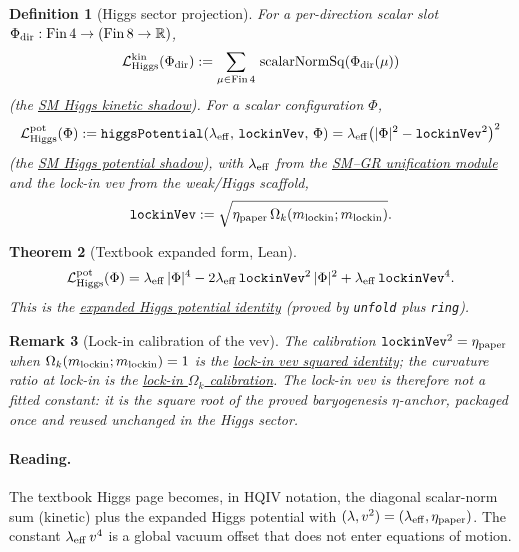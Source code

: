 \documentclass[11pt]{amsart}
\newtheorem{theorem}{Theorem}[section]
\newtheorem{definition}[theorem]{Definition}
\newtheorem{remark}[theorem]{Remark}
\begin{document}
\begin{definition}[Higgs sector projection]
\label{def:higgs}
For a per-direction scalar slot $\Phi_{\rm dir}:\mathrm{Fin}\,4\to(\mathrm{Fin}\,8\to\mathbb{R})$,
\[
\mathcal{L}_{\rm Higgs}^{\rm kin}(\Phi_{\rm dir})
:= \sum_{\mu\in\mathrm{Fin}\,4}\,\mathrm{scalarNormSq}(\Phi_{\rm dir}(\mu))
\]
(the \hyperref[lean:LSM-Higgs-kin]{SM Higgs kinetic shadow}). For a scalar
configuration $\Phi$,
\[
\mathcal{L}_{\rm Higgs}^{\rm pot}(\Phi)
:= \texttt{higgsPotential}(\lambda_{\rm eff},\,\texttt{lockinVev},\,\Phi)
= \lambda_{\rm eff}\bigl(|\Phi|^2 - \texttt{lockinVev}^2\bigr)^2
\]
(the \hyperref[lean:LSM-Higgs-pot]{SM Higgs potential shadow}), with
$\lambda_{\rm eff}$ from the \hyperref[lean:sm-gr]{SM--GR unification module}
and the lock-in vev from the weak/Higgs scaffold,
\[
\texttt{lockinVev}
:= \sqrt{\eta_{\rm paper}\,\Omega_k(m_{\rm lockin};m_{\rm lockin})}.
\]
\end{definition}

\begin{theorem}[Textbook expanded form, Lean]
\label{thm:higgs-expanded}
\[
\mathcal{L}_{\rm Higgs}^{\rm pot}(\Phi)
= \lambda_{\rm eff}\,|\Phi|^4
- 2\lambda_{\rm eff}\,\texttt{lockinVev}^2\,|\Phi|^2
+ \lambda_{\rm eff}\,\texttt{lockinVev}^4 .
\]
This is the \hyperref[lean:higgs-expanded]{expanded Higgs potential identity}
(proved by \texttt{unfold} plus \texttt{ring}).
\end{theorem}

\begin{remark}[Lock-in calibration of the vev]
\label{rem:lockin}
The calibration $\texttt{lockinVev}^2=\eta_{\rm paper}$ when
$\Omega_k(m_{\rm lockin};m_{\rm lockin})=1$ is the
\hyperref[lean:lockin-vev-sq]{lock-in vev squared identity}; the curvature
ratio at lock-in is the
\hyperref[lean:omega-k-lockin]{lock-in $\Omega_k$ calibration}. The lock-in
vev is therefore \emph{not} a fitted constant: it is the square root of the
proved baryogenesis $\eta$-anchor, packaged once and reused unchanged in the
Higgs sector.
\end{remark}

\paragraph{Reading.}
The textbook Higgs page becomes, in HQIV notation, the diagonal scalar-norm
sum (kinetic) plus the expanded Higgs potential with
$(\lambda,v^2)=(\lambda_{\rm eff},\eta_{\rm paper})$. The constant
$\lambda_{\rm eff}\,v^4$ is a global vacuum offset that does not enter
equations of motion.
\end{document}
